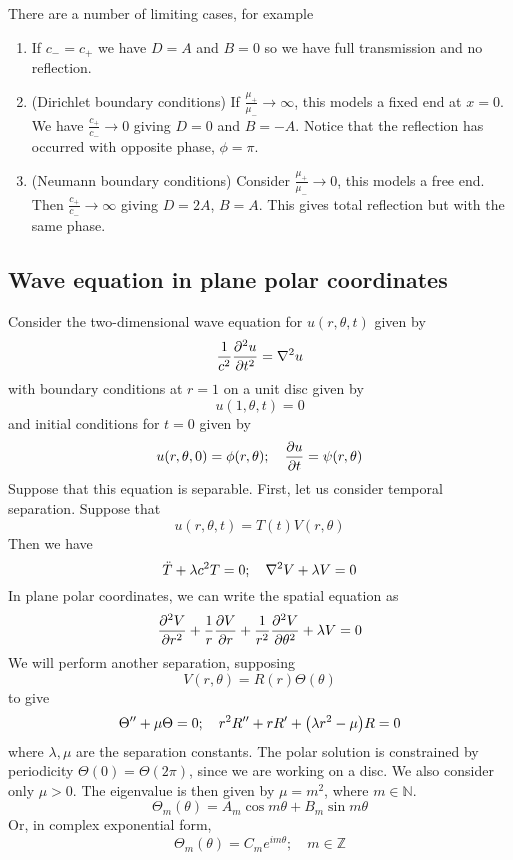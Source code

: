 There are a number of limiting cases, for example
\begin{enumerate}
	\item If \( c_- = c_+ \) we have \( D = A \) and \( B = 0 \) so we have full transmission and no reflection.
	\item (Dirichlet boundary conditions) If \( \frac{\mu_+}{\mu_-} \to \infty \), this models a fixed end at \( x = 0 \).
	      We have \( \frac{c_+}{c_-} \to 0 \) giving \( D = 0 \) and \( B = -A \).
	      Notice that the reflection has occurred with opposite phase, \( \phi = \pi \).
	\item (Neumann boundary conditions) Consider \( \frac{\mu_+}{\mu_-} \to 0 \), this models a free end.
	      Then \( \frac{c_+}{c_-} \to \infty \) giving \( D = 2A \), \( B = A \).
	      This gives total reflection but with the same phase.
\end{enumerate}

\subsection{Wave equation in plane polar coordinates}
Consider the two-dimensional wave equation for \( u(r,\theta,t) \) given by
\[
	\frac{1}{c^2} \pdv[2]{u}{t} = \laplacian u
\]
with boundary conditions at \( r = 1 \) on a unit disc given by
\[
	u(1,\theta,t) = 0
\]
and initial conditions for \( t = 0 \) given by
\[
	u(r,\theta,0) = \phi(r,\theta);\quad \pdv{u}{t}(r,\theta,0) = \psi(r,\theta)
\]
Suppose that this equation is separable.
First, let us consider temporal separation.
Suppose that
\[
	u(r,\theta,t) = T(t) V(r,\theta)
\]
Then we have
\[
	\ddot T + \lambda c^2 T = 0;\quad \laplacian V + \lambda V = 0
\]
In plane polar coordinates, we can write the spatial equation as
\[
	\pdv[2]{V}{r} + \frac{1}{r} \pdv{V}{r} + \frac{1}{r^2}\pdv[2]{V}{\theta} + \lambda V = 0
\]
We will perform another separation, supposing
\[
	V(r,\theta) = R(r) \Theta(\theta)
\]
to give
\[
	\Theta'' + \mu \Theta = 0;\quad r^2 R'' + r R' + \qty(\lambda r^2 - \mu) R = 0
\]
where \( \lambda, \mu \) are the separation constants.
The polar solution is constrained by periodicity \( \Theta(0) = \Theta(2 \pi) \), since we are working on a disc.
We also consider only \( \mu > 0 \).
The eigenvalue is then given by \( \mu = m^2 \), where \( m \in \mathbb N \).
\[
	\Theta_m(\theta) = A_m \cos m \theta + B_m \sin m \theta
\]
Or, in complex exponential form,
\[
	\Theta_m(\theta) = C_m e^{im\theta};\quad m \in \mathbb Z
\]

